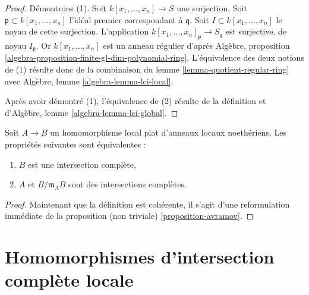 \begin{proof}
Démontrons (1). Soit $k[x_1, \ldots, x_n] \to S$ une surjection.
Soit $\mathfrak p \subset k[x_1, \ldots, x_n]$ l'idéal premier
correspondant à $\mathfrak q$.
Soit $I \subset k[x_1, \ldots, x_n]$ le noyau de cette surjection.
L'application $k[x_1, \ldots, x_n]_\mathfrak p \to S_\mathfrak q$
est surjective, de noyau $I_\mathfrak p$. Or
$k[x_1, \ldots, x_n]$ est un anneau régulier
d'après Algèbre, proposition \ref{algebra-proposition-finite-gl-dim-polynomial-ring}.
L'équivalence des deux notions de (1) résulte donc de la
combinaison du
lemme \ref{lemma-quotient-regular-ring}
avec Algèbre, lemme \ref{algebra-lemma-lci-local}.

\medskip\noindent
Après avoir démontré (1), l'équivalence de (2) résulte de la
définition et d'Algèbre, lemme \ref{algebra-lemma-lci-global}.
\end{proof}

\begin{lemma}
\label{lemma-avramov}
Soit $A \to B$ un homomorphisme local plat d'anneaux locaux noethériens. Les
propriétés suivantes sont équivalentes :
\begin{enumerate}
\item $B$ est une intersection complète,
\item $A$ et $B/\mathfrak m_A B$ sont des intersections complètes.
\end{enumerate}
\end{lemma}

\begin{proof}
Maintenant que la définition est cohérente, il s'agit d'une reformulation
immédiate de la proposition (non triviale) \ref{proposition-avramov}.
\end{proof}









\section{Homomorphismes d'intersection complète locale}
\label{section-lci-homomorphisms}

